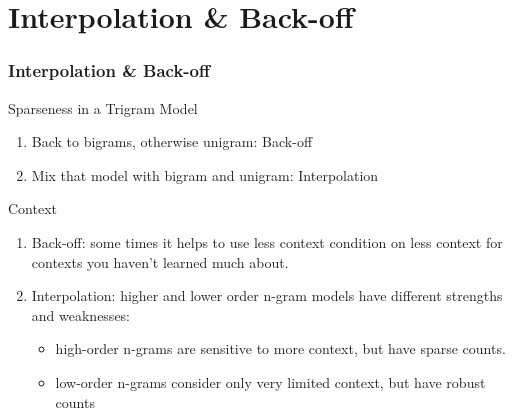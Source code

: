 \documentclass{beamer}
\begin{document}
\section{Interpolation \& Back-off}



\begin{frame}\frametitle{Interpolation \& Back-off}

\begin{block}{Sparseness in a Trigram Model}

\begin{enumerate}
\item Back to bigrams, otherwise unigram: \alert{Back-off}
\item Mix that model with bigram and unigram: \alert{Interpolation} 
\end{enumerate}

\end{block}


\begin{block}{Context}
\begin{enumerate}
\item \alert{Back-off}: 
some times it helps to use less
context condition on less context for contexts
you haven't learned much about.

\item \alert{Interpolation}: 
higher and lower order n-gram models have different strengths and weaknesses:
\begin{itemize}
\item high-order n-grams are sensitive to more context, but have sparse counts.
\item low-order n-grams consider only very limited context, but have robust counts
\end{itemize}
\end{enumerate}

\end{block}


\end{frame}


\end{document}
